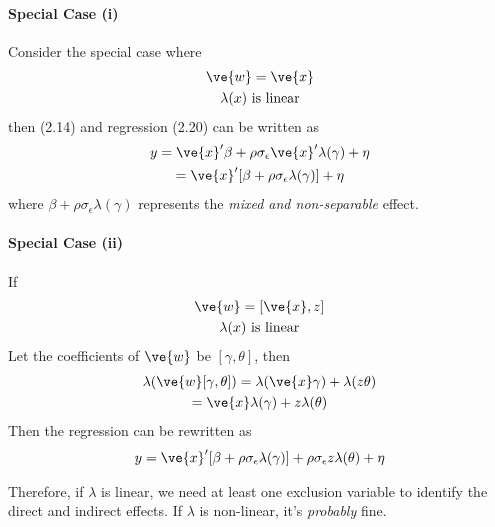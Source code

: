\documentclass[11pt]{article}
\begin{document}
			\paragraph{Special Case (i)} Consider the special case where
			\begin{gather}
				\ve{w} = \ve{x} \\
				\lambda(x) \tx{ is linear}
			\end{gather}
			then (2.14) and regression (2.20) can be written as 
			\begin{gather}
				y = \ve{x}' \beta + \rho \sigma_\epsilon \ve{x}' \lambda(\gamma) + \eta \\
				= \ve{x}' [\beta + \rho \sigma_\epsilon \lambda(\gamma)] + \eta
			\end{gather}
			where $\beta + \rho \sigma_\epsilon \lambda(\gamma)$ represents the \emph{mixed and non-separable} effect. \\
			\paragraph{Special Case (ii)} If
			\begin{gather}
				\ve{w} = [\ve{x}, z] \\
				\lambda(x) \tx{ is linear} \\
			\end{gather}
			Let the coefficients of $\ve{w}$ be $[\gamma, \theta]$, then
			\begin{gather}
				\lambda(\ve{w}[\gamma, \theta]) = \lambda(\ve{x} \gamma) + \lambda(z \theta) \\
				= \ve{x} \lambda(\gamma) + z \lambda(\theta)
			\end{gather}
			Then the regression can be rewritten as
			\begin{gather}
				y = \ve{x}' [\beta + \rho \sigma_\epsilon \lambda(\gamma)] + \rho \sigma_\epsilon z \lambda(\theta) + \eta
			\end{gather}
			\begin{remark}
				Therefore, if $\lambda$ is linear, we need at least one exclusion variable to identify the direct and indirect effects. If $\lambda$ is non-linear, it's \emph{probably} fine.
			\end{remark}
\end{document}
